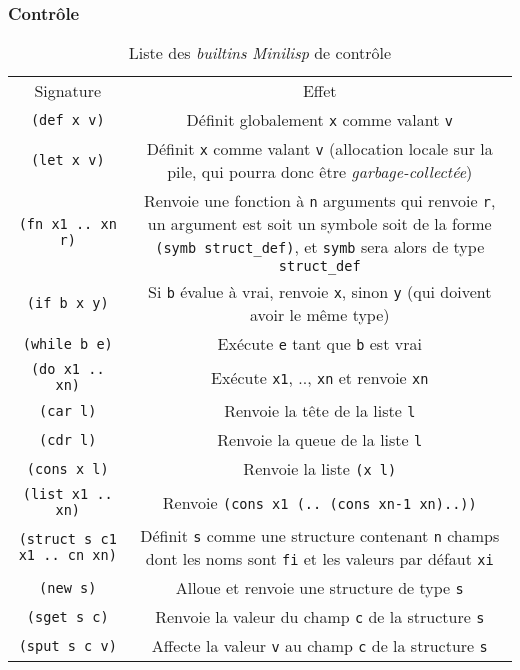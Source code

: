 \documentclass[c, 11pt, handout, xcolor=table]{beamer}
\newcommand{\codeLisp}[1]{\texttt{#1}}
\newcommand{\code}[1]{\texttt{#1}}
\newcommand{\foreign}[1]{\emph{#1}}
\begin{document}
\begin{frame}
 \frametitle{Contrôle}
 
 \begin{table}[H]
  \centering
  \begin{tabularx}{\linewidth}{|C|C|}
    \hline
    Signature & Effet \tabularnewline
    \hhline{|=|=|}
    \codeLisp{(def x v)} & Définit globalement \codeLisp{x} comme valant \codeLisp{v} \tabularnewline
    \hline
    \codeLisp{(let x v)} & Définit \codeLisp{x} comme valant \codeLisp{v} (allocation locale sur la pile, qui pourra donc être \foreign{garbage-collectée}) \tabularnewline
    \hline
    \codeLisp{(fn x1 .. xn r)} & Renvoie une fonction à \code{n} arguments qui renvoie \codeLisp{r}, un argument est soit un symbole soit de la forme \codeLisp{(symb struct_def)}, et \codeLisp{symb} sera alors de type \codeLisp{struct_def} \tabularnewline
    \hhline{|=|=|}
    \codeLisp{(if b x y)} & Si \codeLisp{b} évalue à vrai, renvoie \codeLisp{x}, sinon \codeLisp{y} (qui doivent avoir le même type) \tabularnewline
    \hline
    \codeLisp{(while b e)} & Exécute \codeLisp{e} tant que \codeLisp{b} est vrai \tabularnewline
    \hline
    \codeLisp{(do x1 .. xn)} & Exécute \codeLisp{x1}, .., \codeLisp{xn} et renvoie \codeLisp{xn} \tabularnewline
    \hhline{|=|=|}
    \codeLisp{(car l)} & Renvoie la tête de la liste \codeLisp{l} \tabularnewline
    \hline
    \codeLisp{(cdr l)} & Renvoie la queue de la liste \codeLisp{l} \tabularnewline
    \hline
    \codeLisp{(cons x l)} & Renvoie la liste \codeLisp{(x l)} \tabularnewline
    \hline
    \codeLisp{(list x1 .. xn)} & Renvoie \codeLisp{(cons x1 (.. (cons xn-1 xn)..))} \tabularnewline
    \hhline{|=|=|}
    \codeLisp{(struct s c1 x1 .. cn xn)} & Définit \codeLisp{s} comme une structure contenant \code{n} champs dont les noms sont \codeLisp{fi} et les valeurs par défaut \codeLisp{xi} \tabularnewline
    \hline
    \codeLisp{(new s)} & Alloue et renvoie une structure de type \codeLisp{s} \tabularnewline
    \hline
    \codeLisp{(sget s c)} & Renvoie la valeur du champ \codeLisp{c} de la structure \codeLisp{s} \tabularnewline
    \hline
    \codeLisp{(sput s c v)} & Affecte la valeur \codeLisp{v} au champ \codeLisp{c} de la structure \codeLisp{s} \tabularnewline
    \hline
  \end{tabularx}
  \caption{Liste des \foreign{builtins} \foreign{Minilisp} de contrôle}
 \end{table}
\end{frame}
\end{document}
